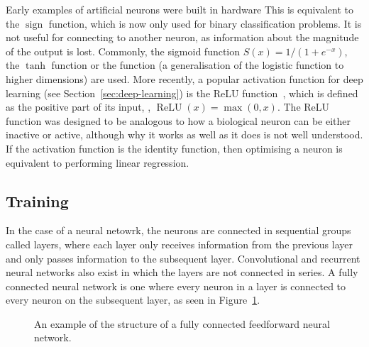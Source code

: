 
Early examples of artificial neurons were built in hardware 
This is equivalent to the \(\operatorname{sign}\) function, which is now only used for binary classification problems.
It is not useful for connecting to another neuron, as information about the magnitude of the output is lost.
Commonly, the sigmoid function \(S(x) = 1/(1 + e^{-x})\), the \(\tanh\) function or the  function (a generalisation of the logistic function to higher dimensions) are used.
More recently, a popular activation function for deep learning (see Section~\ref{sec:deep-learning}) is the \ac{ReLU} function~\autocite{ramachandran2017}, which is defined as the positive part of its input, \ie{}, \(\operatorname{ReLU}(x) = \max(0, x)\).
The \ac{ReLU} function was designed to be analogous to how a biological neuron can be either inactive or active, although why it works as well as it does is not well understood.
If the activation function is the identity function, then optimising a neuron is equivalent to performing linear regression.

\subsection{Training} \label{sec:backpropagation}

In the case of a  neural netowrk, the neurons are connected in sequential groups called layers, where each layer only receives information from the previous layer and only passes information to the subsequent layer.
Convolutional and recurrent neural networks also exist in which the layers are not connected in series.
A fully connected neural network is one where every neuron in a layer is connected to every neuron on the subsequent layer, as seen in Figure~\ref{fig:neural-network-example}.

\begin{figure}[htbp]
	\centering
	
	\caption{An example of the structure of a fully connected feedforward neural network.}
	\label{fig:neural-network-example}
\end{figure}


